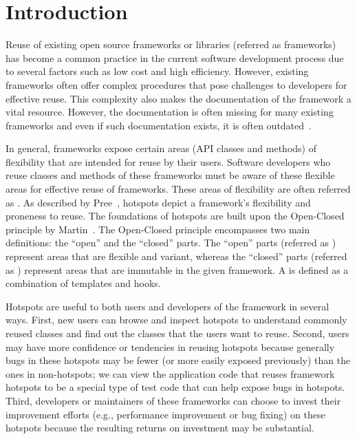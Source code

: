 \section {Introduction}

Reuse of existing open source frameworks or libraries (referred as frameworks)
has become a common practice in the
current software development process due to several factors such as low
cost and high efficiency. However, existing frameworks often offer
complex procedures that pose challenges to developers for effective reuse.
This complexity also makes the documentation of the framework a
vital resource. However, the documentation is often missing for many
existing frameworks and even if such documentation exists, it
is often outdated~\cite{document:leth}.

In general, frameworks expose certain areas (API classes and methods) of
flexibility that are intended for reuse by their users. Software
developers who reuse classes and methods of these frameworks must be aware of
these flexible areas for effective reuse of frameworks. These
areas of flexibility are often referred as .
As described by Pree~\cite{pree:metapatterns}, hotspots depict a framework's
flexibility and proneness to reuse. The foundations of hotspots are
built upon the Open-Closed principle by Martin~\cite{martin:open}.
The Open-Closed principle encompasses two main definitions: the
``open'' and the ``closed'' parts. The ``open'' parts (referred as ) represent
areas that are flexible and variant, whereas the ``closed'' parts (referred as ) 
represent areas that are immutable in the given framework. 
A  is defined as a combination of templates and hooks.

Hotspots are useful to both users and developers of the framework
in several ways. First, new users can browse and inspect hotspots to understand commonly
reused classes and find out the classes that the users want to reuse.
Second, users may have more confidence or tendencies in
reusing hotspots because generally bugs in these hotspots may be
fewer (or more easily exposed previously) than the ones in
non-hotspots; we can view the application code that reuses framework hotspots to be a special
type of test code that can help expose bugs in
hotspots. Third, developers or maintainers of these frameworks can choose to
invest their improvement efforts (e.g., performance improvement or bug fixing) 
on these hotspots because the resulting returns on
investment may be substantial.


